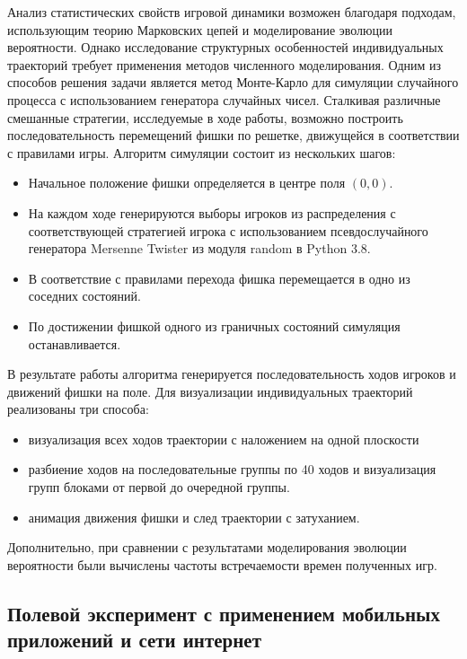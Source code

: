 Анализ статистических свойств игровой динамики возможен благодаря подходам, использующим теорию Марковских цепей
и моделирование эволюции вероятности. Однако исследование структурных особенностей индивидуальных траекторий 
требует применения методов численного моделирования. Одним из способов решения задачи является метод Монте-Карло
для симуляции случайного процесса с использованием генератора случайных чисел. Сталкивая различные смешанные стратегии,
исследуемые в ходе работы, возможно построить последовательность перемещений фишки по решетке, движущейся в соответствии
с правилами игры. Алгоритм симуляции состоит из нескольких шагов:
\begin{itemize}
\item Начальное положение фишки определяется в центре поля $(0, 0)$. 
\item На каждом ходе генерируются выборы игроков из распределения с соответствующей стратегией игрока
с использованием псевдослучайного генератора Mersenne Twister \cite{matsumoto_mersenne_1998} из модуля random в Python 3.8.
\item В соответствие с правилами перехода фишка перемещается в одно из соседних состояний.
\item По достижении фишкой одного из граничных состояний симуляция останавливается.
\end{itemize}

В результате работы алгоритма генерируется последовательность ходов игроков и движений фишки на поле.
Для визуализации индивидуальных траекторий реализованы три способа: 
\begin{itemize}
\item визуализация всех ходов траектории с наложением на одной плоскости
\item разбиение ходов на последовательные группы по 40 ходов и визуализация групп блоками от первой до очередной группы.
\item анимация движения фишки и след траектории с затуханием.
\end{itemize}

Дополнительно, при сравнении с результатами моделирования эволюции вероятности были вычислены частоты
встречаемости времен полученных игр. 

\subsection{Полевой эксперимент с применением мобильных приложений и сети интернет}\label{subsec:ch2/sec2}

